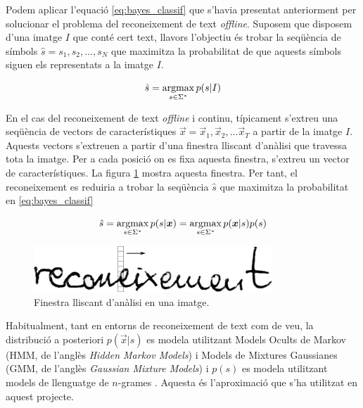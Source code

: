 Podem aplicar l'equació \ref{eq:bayes_classif} que s'havia presentat anteriorment per solucionar el problema del reconeixement de text \emph{offline}. Suposem que disposem d'una imatge $I$ que conté cert text, llavors l'objectiu és trobar la seqüència de símbols $\hat{s} = s_1, s_2, \ldots, s_N$ que maximitza la probabilitat de que aquests símbols siguen els representats a la imatge $I$.

\begin{equation}\label{eq:}
\hat{s} = \operatorname*{argmax}_{s \in \Sigma^*} p(s|I)
\end{equation}

En el cas del reconeixement de text \emph{offline} i continu, típicament s'extreu una seqüència de vectors de característiques $\vec{x} = \vec{x}_1, \vec{x}_2, \ldots \vec{x}_T$ a partir de la imatge $I$. Aquests vectors s'extreuen a partir d'una finestra lliscant d'anàlisi que travessa tota la imatge. Per a cada posició on es fixa aquesta finestra, s'extreu un vector de característiques. La figura \ref{fig:finestra_lliscant} mostra aquesta finestra. Per tant, el reconeixement es reduiria a trobar la seqüència $\hat{s}$ que maximitza la probabilitat en  \ref{eq:bayes_classif}

\begin{equation}\label{eq:bayes_classif_vectors}
\hat{s} = \argmax_{s \in \Sigma^*} p(s|\vec{x}) = \argmax_{s \in \Sigma^*} p(\vec{x}|s) p(s) %
\end{equation}

\begin{figure}
\centering
\includegraphics[width=0.8\textwidth]{images/finestra_lliscant.eps}
\caption{Finestra lliscant d'anàlisi en una imatge.}
\label{fig:finestra_lliscant}
\end{figure}

Habitualment, tant en entorns de reconeixement de text com de veu, la distribució a posteriori $p(\vec{x}|s)$ es modela utilitzant Models Ocults de Markov (HMM, de l'anglès \emph{Hidden Markov Models}) i Models de Mixtures Gaussianes (GMM, de l'anglès \emph{Gaussian Mixture Models}) \cite{huanghidden, jelinek1998statistical, ghahramani2001introduction} i $p(s)$ es modela utilitzant models de llenguatge de $n$-grames \cite{jelinek1998statistical,katz1987estimation,marti2001using}. Aquesta és l'aproximació que s'ha utilitzat en aquest projecte.